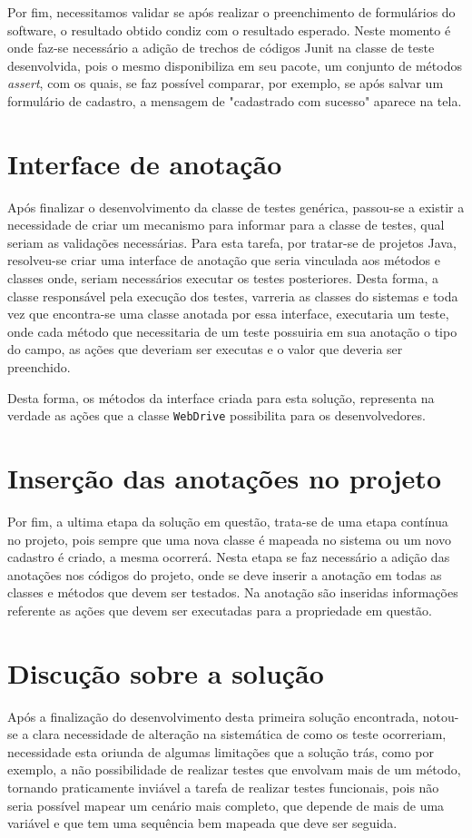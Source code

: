 \documentclass[tg]{mdtufsm}
\begin{document}
Por fim, necessitamos validar se após realizar o preenchimento de formulários do software, o resultado obtido condiz com o resultado esperado. Neste momento é onde faz-se necessário a adição de trechos de códigos Junit na classe de teste desenvolvida, pois o mesmo disponibiliza em seu pacote, um conjunto de métodos \emph{assert}, com os quais, se faz possível comparar, por exemplo, se após salvar um formulário de cadastro, a mensagem de "cadastrado com sucesso" aparece na tela.

\section{Interface de anotação}

Após finalizar o desenvolvimento da classe de testes genérica, passou-se a existir a necessidade de criar um mecanismo para informar para a classe de testes, qual seriam as validações necessárias. Para esta tarefa, por tratar-se de projetos Java, resolveu-se criar uma interface de anotação que seria vinculada aos métodos e classes onde, seriam necessários executar os testes posteriores. Desta forma, a classe responsável pela execução dos testes, varreria as classes do sistemas e toda vez que encontra-se uma classe anotada por essa interface, executaria um teste, onde cada método que necessitaria de um teste possuiria em sua anotação o tipo do campo, as ações que deveriam ser executas e o valor que deveria ser preenchido.

Desta forma, os métodos da interface criada para esta solução, representa na verdade as ações que a classe \texttt{WebDrive} possibilita para os desenvolvedores.

\section{Inserção das anotações no projeto}
Por fim, a ultima etapa da solução em questão, trata-se de uma etapa contínua no projeto, pois sempre que uma nova classe é mapeada no sistema ou um novo cadastro é criado, a mesma ocorrerá. Nesta etapa se faz necessário a adição das anotações nos códigos do projeto, onde se deve inserir a anotação em todas as classes e métodos que devem ser testados. Na anotação são inseridas informações referente as ações que devem ser executadas para a propriedade em questão.

\section{Discução sobre a solução}
Após a finalização do desenvolvimento desta primeira solução encontrada, notou-se a clara necessidade de alteração na sistemática de como os teste ocorreriam, necessidade esta oriunda de algumas limitações que a solução trás, como por exemplo, a não possibilidade de realizar testes que envolvam mais de um método, tornando praticamente inviável a tarefa de realizar testes funcionais, pois não seria possível mapear um cenário mais completo, que depende de mais de uma variável e que tem uma sequência bem mapeada que deve ser seguida. 
\end{document}
